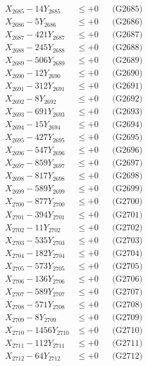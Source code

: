\documentclass[a4paper,10pt]{article}
\begin{document}
{\begin{align}
X_{2685} - 14Y_{2685} &\leq +0 && \text{(G2685)} \\
X_{2686} - 5Y_{2686} &\leq +0 && \text{(G2686)} \\
X_{2687} - 421Y_{2687} &\leq +0 && \text{(G2687)} \\
X_{2688} - 245Y_{2688} &\leq +0 && \text{(G2688)} \\
X_{2689} - 506Y_{2689} &\leq +0 && \text{(G2689)} \\
X_{2690} - 12Y_{2690} &\leq +0 && \text{(G2690)} \\
\allowbreak
X_{2691} - 312Y_{2691} &\leq +0 && \text{(G2691)} \\
X_{2692} - 8Y_{2692} &\leq +0 && \text{(G2692)} \\
X_{2693} - 691Y_{2693} &\leq +0 && \text{(G2693)} \\
X_{2694} - 15Y_{2694} &\leq +0 && \text{(G2694)} \\
X_{2695} - 427Y_{2695} &\leq +0 && \text{(G2695)} \\
X_{2696} - 547Y_{2696} &\leq +0 && \text{(G2696)} \\
X_{2697} - 859Y_{2697} &\leq +0 && \text{(G2697)} \\
X_{2698} - 817Y_{2698} &\leq +0 && \text{(G2698)} \\
X_{2699} - 589Y_{2699} &\leq +0 && \text{(G2699)} \\
X_{2700} - 877Y_{2700} &\leq +0 && \text{(G2700)} \\
\allowbreak
X_{2701} - 394Y_{2701} &\leq +0 && \text{(G2701)} \\
X_{2702} - 11Y_{2702} &\leq +0 && \text{(G2702)} \\
X_{2703} - 535Y_{2703} &\leq +0 && \text{(G2703)} \\
X_{2704} - 182Y_{2704} &\leq +0 && \text{(G2704)} \\
X_{2705} - 573Y_{2705} &\leq +0 && \text{(G2705)} \\
X_{2706} - 136Y_{2706} &\leq +0 && \text{(G2706)} \\
X_{2707} - 589Y_{2707} &\leq +0 && \text{(G2707)} \\
X_{2708} - 571Y_{2708} &\leq +0 && \text{(G2708)} \\
X_{2709} - 8Y_{2709} &\leq +0 && \text{(G2709)} \\
X_{2710} - 1456Y_{2710} &\leq +0 && \text{(G2710)} \\
\allowbreak
X_{2711} - 112Y_{2711} &\leq +0 && \text{(G2711)} \\
X_{2712} - 64Y_{2712} &\leq +0 && \text{(G2712)} \\

\end{align}}
\end{document}
